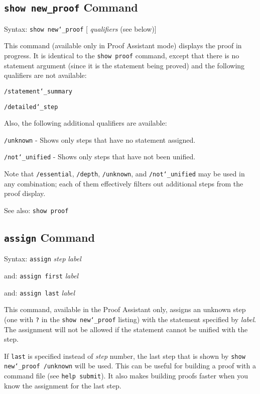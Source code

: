 \subsection{\texttt{show new\_proof} Command}
Syntax:  \texttt{show new{\char`\_}proof} [{\em
qualifiers} (see below)]

This command (available only in Proof Assistant mode) displays the proof
in progress.  It is identical to the \texttt{show proof} command, except that
there is no statement argument (since it is the statement being proved) and
the following qualifiers are not available:

    \texttt{/statement{\char`\_}summary}

    \texttt{/detailed{\char`\_}step}

Also, the following additional qualifiers are available:

    \texttt{/unknown} - Shows only steps that have no statement assigned.

    \texttt{/not{\char`\_}unified} - Shows only steps that have not been unified.

Note that \texttt{/essential}, \texttt{/depth}, \texttt{/unknown}, and
\texttt{/not{\char`\_}unified} may be
used in any combination; each of them effectively filters out additional
steps from the proof display.

See also:  \texttt{show proof}






\subsection{\texttt{assign} Command}
Syntax:   \texttt{assign} {\em step} {\em label}

   and:   \texttt{assign first} {\em label}

   and:   \texttt{assign last} {\em label}


This command, available in the Proof Assistant only, assigns an unknown
step (one with \texttt{?} in the \texttt{show new{\char`\_}proof}
listing) with the statement specified by {\em label}.  The assignment
will not be allowed if the statement cannot be unified with the step.

If \texttt{last} is specified instead of {\em step} number, the last
step that is shown by \texttt{show new{\char`\_}proof /unknown} will be
used.  This can be useful for building a proof with a command file (see
\texttt{help submit}).  It also makes building proofs faster when you know
the assignment for the last step.

